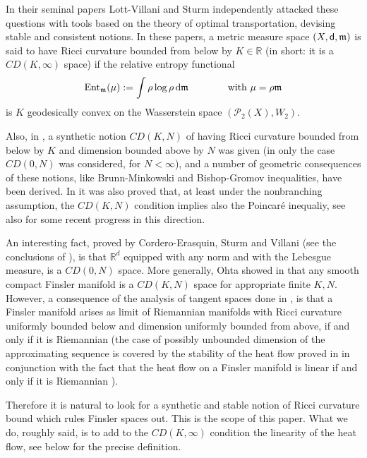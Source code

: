 \documentclass[reqno,11pt]{article}
\numberwithin{equation}{section}
\newcommand{\R}{\mathbb{R}}
\newcommand{\mm}{{\mbox{\boldmath$m$}}}
\newcommand{\sfd}{{\sf d}}
\renewcommand{\d}{{\mathrm d}}
\newcommand{\ProbabilitiesTwo}[1]{\mathscr P_2(#1)}     %
\newcommand{\probt}{\ProbabilitiesTwo}
\newcommand{\entr}[2]{{\rm Ent}_{#2}(#1)}              %
\renewcommand{\mm}{\mathfrak m}
\begin{document}
In their seminal papers Lott-Villani \cite{Lott-Villani09} and Sturm
\cite{Sturm06I} independently attacked these questions with tools
based on the theory of optimal transportation, devising stable and
consistent notions. In these papers, a metric measure space
$(X,\sfd,\mm)$ is said to have Ricci curvature bounded from below by
$K\in\R$ (in short: it is a $CD(K,\infty)$ space) if the relative
entropy functional
$$
\entr{\mu}{\mm}:=\int\rho\log\rho\,\d\mm\qquad\qquad\text{with
$\mu=\rho\mm$}
$$
is $K$ geodesically convex on the Wasserstein space $(\probt
X,W_2)$.

Also, in \cite{Lott-Villani09}, \cite{Sturm06II} a synthetic notion
$CD(K,N)$ of having Ricci curvature bounded from below  by $K$ and
dimension bounded above by $N$ was given (in \cite{Lott-Villani09}
only the case $CD(0,N)$ was considered, for $N<\infty$), and a
number of geometric consequences of these notions, like
Brunn-Minkowski and Bishop-Gromov inequalities, have been derived.
In \cite{Lott-Villani-Poincare} it was also proved that, at least
under the nonbranching assumption, the $CD(K,N)$ condition implies
also the Poincar\'e inequaliy, see also \cite{Rajala11} for some
recent progress in this direction.

An interesting fact, proved by Cordero-Erasquin, Sturm and Villani
(see the conclusions of \cite{Villani09}), is that $\R^d$ equipped
with any norm and with the Lebesgue measure, is a $CD(0,N)$ space.
More generally, Ohta showed in \cite{Ohta09} that any smooth compact
Finsler manifold is a $CD(K,N)$ space for appropriate finite $K,N$.
However, a consequence of the analysis of tangent spaces done in
\cite{Cheeger-Colding97}, is that a Finsler manifold arises as limit
of Riemannian manifolds with Ricci curvature uniformly bounded below
and dimension uniformly bounded from above, if and only if it is
Riemannian (the case of possibly unbounded dimension of the
approximating sequence is covered by the stability of the heat flow
proved in \cite{Gigli10} in conjunction with the fact that the heat
flow on a Finsler manifold is linear if and only if it is Riemannian
\cite{Sturm-Ohta-CPAM}).

Therefore it is natural to look for a synthetic and stable notion of
Ricci curvature bound which rules Finsler spaces out. This is the
scope of this paper. What we do, roughly said, is to add to the
$CD(K,\infty)$ condition the linearity of the heat flow, see below
for the precise definition.
\end{document}
